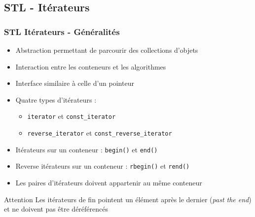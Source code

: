 \documentclass[C++.tex]{subfiles}
\begin{document}
\subsection*{STL - Itérateurs}
\begin{frame}
	\frametitle{STL Itérateurs - Généralités}
	\begin{itemize}
		\item Abstraction permettant de parcourir des collections d'objets
		\item Interaction entre les conteneurs et les algorithmes
		\item Interface similaire à celle d'un pointeur
		\item Quatre types d'itérateurs :
		\begin{itemize}
			\item \lstinline|iterator| et \lstinline|const_iterator|
			\item \lstinline|reverse_iterator| et \lstinline|const_reverse_iterator|


		\end{itemize}
		\item Itérateurs sur un conteneur : \lstinline|begin()| et \lstinline|end()|
		\item Reverse itérateurs sur un conteneur : \lstinline|rbegin()| et \lstinline|rend()|
		\item Les paires d'itérateurs doivent appartenir au même conteneur
	\end{itemize}

	\begin{alertblock}{Attention}
		Les itérateurs de fin pointent un élément après le dernier (\og \textit{past the end}\fg{}) et ne doivent pas être déréférencés
	\end{alertblock}
\end{frame}
\end{document}
